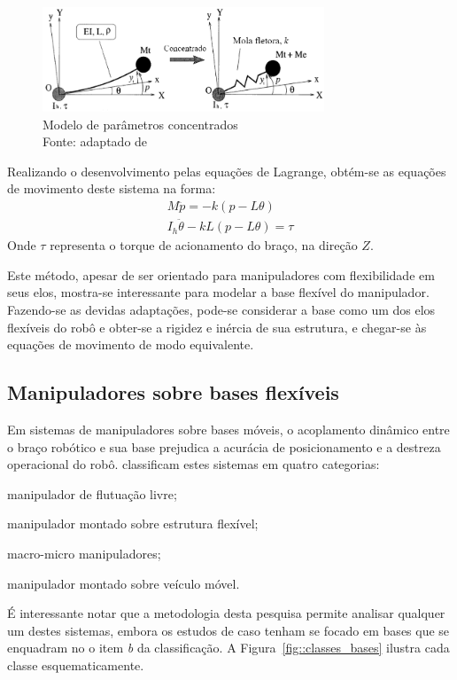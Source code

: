 \begin{figure}[h]
	\centering 
 	\includegraphics[width=0.75\textwidth]{figs/lumped}
 	\caption[Modelo de parâmetros concentrados]{Modelo de parâmetros concentrados
 	\\ Fonte: adaptado de \cite{zhu1999simulation}}
 	\label{fig::lumped}
\end{figure}

Realizando o desenvolvimento pelas equações de Lagrange, obtém-se as equações de
movimento deste sistema na forma:
%
\begin{gather}
	M \ddot{p} = -k(p-L \theta) \\
	I_h \ddot{\theta} - k L(p-L \theta) = \tau
\end{gather}
%
Onde $\tau$ representa o torque de acionamento do braço, na direção $Z$.

Este método, apesar de ser orientado para manipuladores com flexibilidade em
seus elos, mostra-se interessante para modelar a base flexível do manipulador.
Fazendo-se as devidas adaptações, pode-se considerar a base como um dos elos
flexíveis do robô e obter-se a rigidez e inércia de sua estrutura, e chegar-se
às equações de movimento de modo equivalente.


\subsection{Manipuladores sobre bases flexíveis}

Em sistemas de manipuladores sobre bases móveis, o acoplamento dinâmico entre o
braço robótico e sua base prejudica a acurácia de posicionamento e a destreza
operacional do robô. \citet{yoshida1996moving} classificam estes sistemas em
quatro categorias:
%
\begin{enumerate*}[label=\alph*)]
	\item manipulador de flutuação livre;
	\item manipulador montado sobre estrutura flexível;
	\item macro-micro manipuladores;
	\item manipulador montado sobre veículo móvel.
\end{enumerate*}
%
É interessante notar que a metodologia desta pesquisa permite analisar qualquer
um destes sistemas, embora os estudos de caso tenham se focado em bases que se
enquadram no o item \emph{b} da classificação. A Figura~\ref{fig::classes_bases}
ilustra cada classe esquematicamente.

